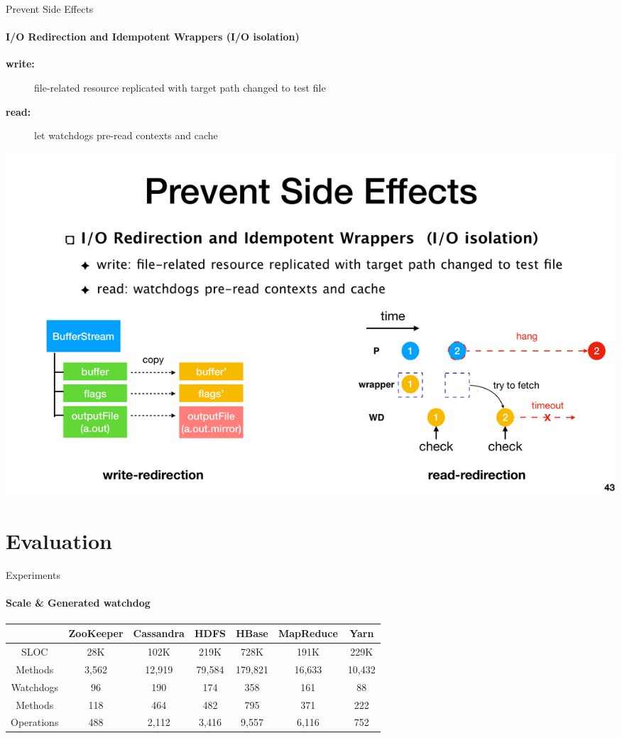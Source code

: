 \documentclass[aspectratio=169]{beamer}
\begin{document}
\begin{frame}{Prevent Side Effects}
    \framesubtitle{I/O Redirection and Idempotent Wrappers (I/O isolation)}
    \begin{description}
        \item[\textbf{write:}] file-related resource replicated with target path changed to test file
        \item[\textbf{read:}] let watchdogs pre-read contexts and cache
    \end{description}

    \begin{center}
        \includegraphics[width=.9\textwidth]{fig/io}
    \end{center}
\end{frame}
\section{Evaluation}
\begin{frame}{Experiments}
    \framesubtitle{Scale \& Generated watchdog}
    \begin{tabular}{c|c|c|c|c|c|c}
        \toprule
                   & ZooKeeper & Cassandra & HDFS   & HBase   & MapReduce & Yarn   \\
        \midrule
        SLOC       & 28K       & 102K      & 219K   & 728K    & 191K      & 229K   \\
        Methods    & 3,562     & 12,919    & 79,584 & 179,821 & 16,633    & 10,432 \\
        \midrule
        Watchdogs  & 96        & 190       & 174    & 358     & 161       & 88     \\
        Methods    & 118       & 464       & 482    & 795     & 371       & 222    \\
        Operations & 488       & 2,112     & 3,416  & 9,557   & 6,116     & 752    \\
        \bottomrule
    \end{tabular}
\end{frame}
\end{document}
